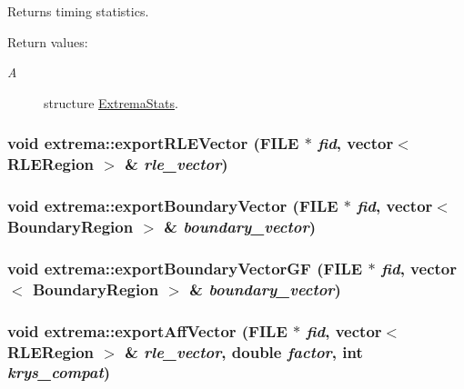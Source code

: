 Returns timing statistics. 

\begin{Desc}
\item[Return values:]
\begin{description}
\item[{\em A}]structure \hyperlink{structextrema_1_1ExtremaStats}{Extrema\-Stats}. \end{description}
\end{Desc}
\hypertarget{namespaceextrema_58eea100971137f5cec506645277cee0}{
\subsubsection[exportRLEVector]{\setlength{\rightskip}{0pt plus 5cm}void extrema::export\-RLEVector (FILE $\ast$ {\em fid}, vector$<$ RLERegion $>$ \& {\em rle\_\-vector})}}
\label{namespaceextrema_58eea100971137f5cec506645277cee0}


\hypertarget{namespaceextrema_db847a7fd375f76760e321deb99b5e45}{
\subsubsection[exportBoundaryVector]{\setlength{\rightskip}{0pt plus 5cm}void extrema::export\-Boundary\-Vector (FILE $\ast$ {\em fid}, vector$<$ Boundary\-Region $>$ \& {\em boundary\_\-vector})}}
\label{namespaceextrema_db847a7fd375f76760e321deb99b5e45}


\hypertarget{namespaceextrema_c167f43bca8c70f36b431ba71daff257}{
\subsubsection[exportBoundaryVectorGF]{\setlength{\rightskip}{0pt plus 5cm}void extrema::export\-Boundary\-Vector\-GF (FILE $\ast$ {\em fid}, vector$<$ Boundary\-Region $>$ \& {\em boundary\_\-vector})}}
\label{namespaceextrema_c167f43bca8c70f36b431ba71daff257}


\hypertarget{namespaceextrema_55d2b078be8022879998650901d734a1}{
\subsubsection[exportAffVector]{\setlength{\rightskip}{0pt plus 5cm}void extrema::export\-Aff\-Vector (FILE $\ast$ {\em fid}, vector$<$ RLERegion $>$ \& {\em rle\_\-vector}, double {\em factor}, int {\em krys\_\-compat})}}
\label{namespaceextrema_55d2b078be8022879998650901d734a1}


